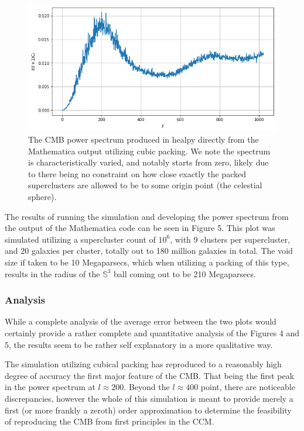 \documentclass[a4paper]{article}
\begin{document}
    \begin{figure}[h!]
        \centering
        \includegraphics[width=\textwidth]{spectrum_ccm.png}
        \caption{The CMB power spectrum produced in healpy directly from the
            Mathematica output utilizing cubic packing. We note the
            spectrum is characteristically varied, and notably starts from
            zero, likely due to there being no constraint on how close exactly
            the packed superclusters are allowed to be to some origin point (the
            celestial sphere).}
    \end{figure}

    The results of running the simulation and developing the power spectrum
    from the output of the Mathematica code can be seen in Figure 5. This plot
    was simulated utilizing a supercluster count of $10^6$, with 9 clusters per
    supercluster, and 20 galaxies per cluster, totally out to 180 million
    galaxies in total. The void size if taken to be 10 Megaparsecs, which
    when utilizing a packing of this type, results in the radius of the
    $\mathbb{S}^3$ ball coming out to be 210 Megaparsecs.

    \subsubsection{Analysis}
    While a complete analysis of the average error between the two plots would
    certainly provide a rather complete and quantitative analysis of the Figures
    4 and 5, the results seem to be rather self explanatory in a more
    qualitative way. 

    The simulation utilizing cubical packing has reproduced to a reasonably
    high degree of accuracy the first major feature of the CMB. That being the
    first peak in the power spectrum at $l \approx 200$. Beyond the $l \approx
    400$ point, there are noticeable discrepancies, however the whole of this
    simulation is meant to provide merely a first (or more frankly a zeroth)
    order approximation to determine the feasibility of reproducing the CMB
    from first principles in the CCM. 
\end{document}

